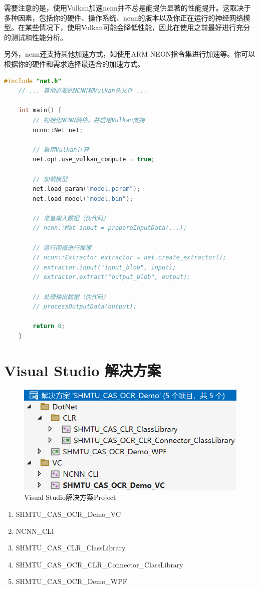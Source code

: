 需要注意的是，使用Vulkan加速ncnn并不总是能提供显著的性能提升。这取决于多种因素，包括你的硬件、操作系统、ncnn的版本以及你正在运行的神经网络模型。在某些情况下，使用Vulkan可能会降低性能，因此在使用之前最好进行充分的测试和性能分析。

另外，ncnn还支持其他加速方式，如使用ARM NEON指令集进行加速等。你可以根据你的硬件和需求选择最适合的加速方式。

\begin{lstlisting}[caption={NCNN with Vulkan Initialization}, language=C++]
	#include "net.h"
	// ... 其他必要的NCNN和Vulkan头文件 ...

	int main() {
		// 初始化NCNN网络，并启用Vulkan支持
		ncnn::Net net;

		// 启用Vulkan计算
		net.opt.use_vulkan_compute = true;

		// 加载模型
		net.load_param("model.param");
		net.load_model("model.bin");

		// 准备输入数据（伪代码）
		// ncnn::Mat input = prepareInputData(...);

		// 运行网络进行推理
		// ncnn::Extractor extractor = net.create_extractor();
		// extractor.input("input_blob", input);
		// extractor.extract("output_blob", output);

		// 处理输出数据（伪代码）
		// processOutputData(output);

		return 0;
	}
\end{lstlisting}

\section{Visual Studio 解决方案}

\begin{figure}
	\centering
	\includegraphics[width=0.7\linewidth]{Resources/Picture/vs}
	\caption{Visual Studio解决方案Project}
	\label{fig:vs}
\end{figure}

\begin{enumerate}
	\item SHMTU\_CAS\_OCR\_Demo\_VC
	\item NCNN\_CLI
	\item SHMTU\_CAS\_CLR\_ClassLibrary
	\item SHMTU\_CAS\_OCR\_CLR\_Connector\_ClassLibrary
	\item SHMTU\_CAS\_OCR\_Demo\_WPF
\end{enumerate}

